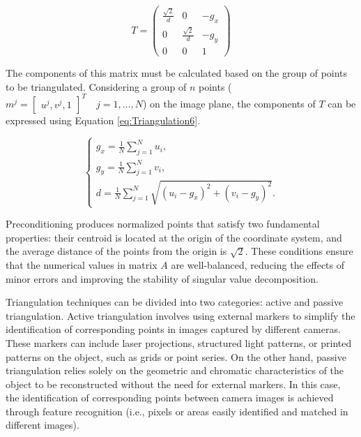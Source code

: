 \begin{equation}
  T =
  \begin{pmatrix}
    \frac{\sqrt{2}}{d} & 0  & -g_x \\
    0 & \frac{\sqrt{2}}{d} & -g_y \\
    0 & 0 & 1
  \end{pmatrix}
  \label{eq:Triangulation5}
\end{equation}

The components of this matrix must be calculated based on the group of points to be triangulated.  
Considering a group of $n$ points ($m^j = \begin{bmatrix} u^j, v^j, 1\end{bmatrix}^T \quad j = 1, \dots, N$) on the image plane, the components of $T$ can be expressed using Equation \ref{eq:Triangulation6}.

\begin{equation}
  \begin{cases}
    g_x = \frac{1}{N} \sum_{j=1}^{N} u_i, \\[10pt]
    g_y = \frac{1}{N} \sum_{j=1}^{N} v_i, \\[10pt]
    d = \frac{1}{N} \sum_{j=1}^{N} \sqrt{(u_i - g_x)^2 + (v_i - g_y)^2}.
  \end{cases}
  \label{eq:Triangulation6}
\end{equation}

Preconditioning produces normalized points that satisfy two fundamental properties: their centroid is located at the origin of the coordinate system, and the average distance of the points from the origin is $\sqrt{2}$. These conditions ensure that the numerical values in matrix $A$ are well-balanced, reducing the effects of minor errors and improving the stability of singular value decomposition.

Triangulation techniques can be divided into two categories: active and passive triangulation. Active triangulation involves using external markers to simplify the identification of corresponding points in images captured by different cameras. These markers can include laser projections, structured light patterns, or printed patterns on the object, such as grids or point series. On the other hand, passive triangulation relies solely on the geometric and chromatic characteristics of the object to be reconstructed without the need for external markers. In this case, the identification of corresponding points between camera images is achieved through feature recognition (i.e., pixels or areas easily identified and matched in different images).

